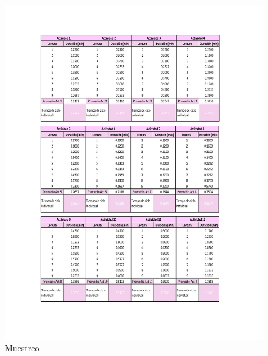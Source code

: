     \begin{figure}[H]
        \centering
        \includegraphics[scale=0.3]{9/Img/muestreo.pdf}
        \caption{Muestreo}
        \label{fig:muestreo}
    \end{figure}
